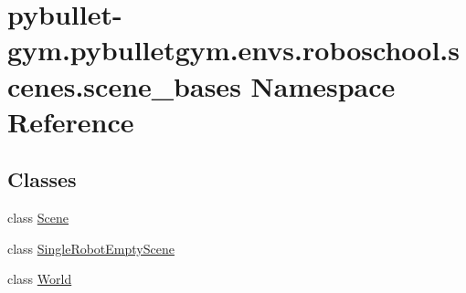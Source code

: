 \hypertarget{namespacepybullet-gym_1_1pybulletgym_1_1envs_1_1roboschool_1_1scenes_1_1scene__bases}{}\section{pybullet-\/gym.pybulletgym.\+envs.\+roboschool.\+scenes.\+scene\+\_\+bases Namespace Reference}
\label{namespacepybullet-gym_1_1pybulletgym_1_1envs_1_1roboschool_1_1scenes_1_1scene__bases}
\subsection*{Classes}
\begin{DoxyCompactItemize}
\item 
class \hyperlink{classpybullet-gym_1_1pybulletgym_1_1envs_1_1roboschool_1_1scenes_1_1scene__bases_1_1_scene}{Scene}
\item 
class \hyperlink{classpybullet-gym_1_1pybulletgym_1_1envs_1_1roboschool_1_1scenes_1_1scene__bases_1_1_single_robot_empty_scene}{Single\+Robot\+Empty\+Scene}
\item 
class \hyperlink{classpybullet-gym_1_1pybulletgym_1_1envs_1_1roboschool_1_1scenes_1_1scene__bases_1_1_world}{World}
\end{DoxyCompactItemize}
